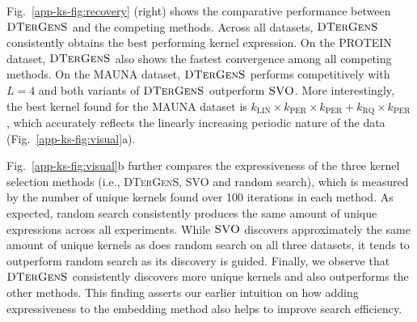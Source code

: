Fig.~\ref{app-ks-fig:recovery} (right) shows the comparative performance between $\textsc{DTerGenS}$ and the competing methods. Across all datasets, $\textsc{DTerGenS}$ consistently obtains the best performing kernel expression. On the PROTEIN dataset, $\textsc{DTerGenS}$ also shows the fastest convergence among all competing methods. On the MAUNA dataset, $\textsc{DTerGenS}$ performs competitively with $L=4$ and both variants of $\textsc{DTerGenS}$ outperform $\textsc{SVO}$. More interestingly, the best kernel found for the MAUNA dataset is $k_\mathrm{LIN}\times k_\mathrm{PER}\times k_\mathrm{PER} + k_\mathrm{RQ}\times k_\mathrm{PER}$, which accurately reflects the linearly increasing periodic nature of the data (Fig.~\ref{app-ks-fig:visual}a).

Fig.~\ref{app-ks-fig:visual}b further compares the expressiveness of the three kernel selection methods (i.e., \textsc{DTerGenS}, \textsc{SVO} and random search), which is measured by the number of unique kernels found over 100 iterations in each method. As expected, random search consistently produces the same amount of unique expressions across all experiments. While $\textsc{SVO}$ discovers approximately the same amount of unique kernels as does random search on all three datasets, it tends to outperform random search as its discovery is guided. Finally, we observe that $\textsc{DTerGenS}$ consistently discovers more unique kernels and also outperforms the other methods. This finding asserts our earlier intuition on how adding expressiveness to the embedding method also helps to improve search efficiency.
